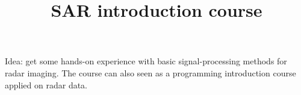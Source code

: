 \documentclass[11pt]{article} %
\begin{document}
\title{SAR introduction course}
{\let\newpage\relax\maketitle}
Idea: get some hands-on experience with basic signal-processing methods for radar imaging. The course can also seen as a programming introduction course applied on radar data. 





\end{document}
